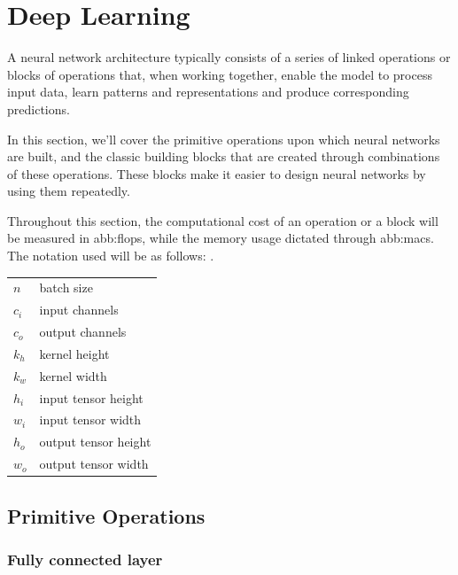 \section{Deep Learning}\label{sec:hw-nas:dl}

    A neural network architecture typically consists of a series of linked operations or blocks of operations that, when working together, enable the model to process input data, learn patterns and representations and produce corresponding predictions.
    
    In this section, we'll cover the primitive operations upon which neural networks are built, and the classic building blocks that are created through combinations of these operations. These blocks make it easier to design neural networks by using them repeatedly.
    
    Throughout this section, the computational cost of an operation or a block will be measured in \gls{abb:flops}, while the memory usage  dictated through \gls{abb:macs}. The notation used will be as follows:
    .

    \begin{table}[hbt!]
        \begin{tabularx}{\textwidth}{@{}XX@{}}
        \toprule
          $n$ & batch size \\
          $c_i$ & input channels \\
          $c_o$ & output channels \\
          $k_h$ & kernel height \\
          $k_w$ & kernel width \\
          $h_i$ & input tensor height \\
          $w_i$ & input tensor width \\
          $h_o$ & output tensor height \\
          $w_o$ & output tensor width \\
        \bottomrule
        \end{tabularx}
    \end{table}


    
    \subsection{Primitive Operations}
            
        \subsubsection{Fully connected layer}
        
